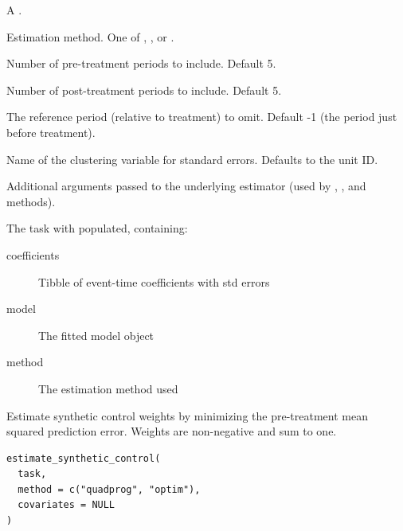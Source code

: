 \documentclass[a4paper]{book}
\begin{document}
\begin{Arguments}
\begin{ldescription}
\item[\code{task}] A .

\item[\code{method}] Estimation method. One of ,
, or .

\item[\code{leads}] Number of pre-treatment periods to include. Default 5.

\item[\code{lags}] Number of post-treatment periods to include. Default 5.

\item[\code{base\_period}] The reference period (relative to treatment) to omit.
Default -1 (the period just before treatment).

\item[\code{cluster}] Name of the clustering variable for standard errors.
Defaults to the unit ID.

\item[\code{...}] Additional arguments passed to the underlying estimator
(used by , ,
and  methods).
\end{ldescription}
\end{Arguments}
%
\begin{Value}
The task with  populated, containing:
\begin{description}

\item[coefficients] Tibble of event-time coefficients with std errors
\item[model] The fitted model object
\item[method] The estimation method used

\end{description}

\end{Value}
%
\begin{Description}
Estimate synthetic control weights by minimizing the pre-treatment
mean squared prediction error. Weights are non-negative and sum to one.
\end{Description}
%
\begin{Usage}
\begin{verbatim}
estimate_synthetic_control(
  task,
  method = c("quadprog", "optim"),
  covariates = NULL
)
\end{verbatim}
\end{Usage}
\end{document}
